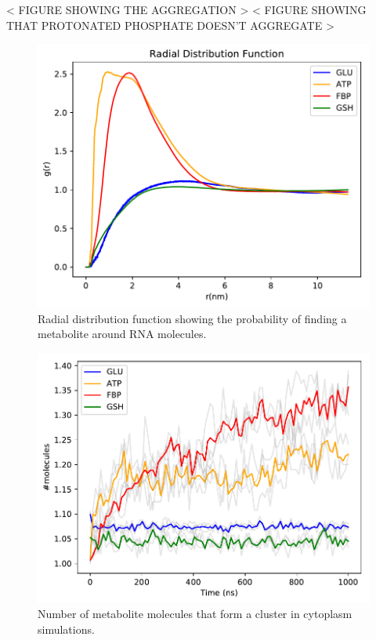 \documentclass[journal=jacsat,manuscript=article]{achemso}
\begin{document}
< FIGURE SHOWING THE AGGREGATION >
< FIGURE SHOWING THAT PROTONATED PHOSPHATE DOESN'T AGGREGATE >



\begin{figure}
\includegraphics[scale=0.6]{rdf_RNA_metabolites.pdf}
\caption{Radial distribution function showing the probability of finding a metabolite around RNA molecules.}
\end{figure}

\begin{figure}
\includegraphics[scale=0.6]{avclust.pdf}
\caption{Number of metabolite molecules that form a cluster in cytoplasm simulations.}
\end{figure}
\end{document}
